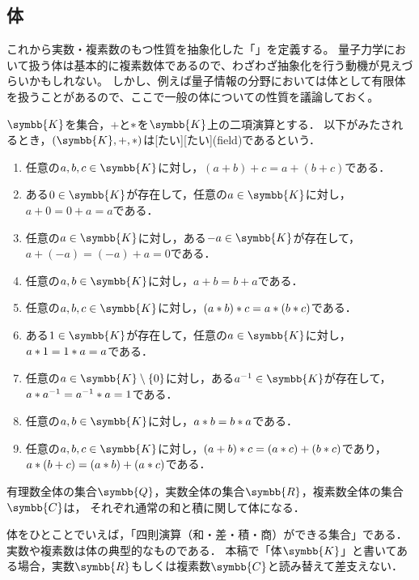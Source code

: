 \documentclass[../sotsu.tex]{subfiles}
\begin{document}
\subsection{体}

これから実数・複素数のもつ性質を抽象化した「」を定義する。
量子力学において扱う体は基本的に複素数体であるので、わざわざ抽象化を行う動機が見えづらいかもしれない。
しかし、例えば量子情報の分野においては体として有限体を扱うことがあるので、ここで一般の体についての性質を議論しておく。

\begin{definition}[体]
    \label{dfn:field}
    $\symbb{K}$を集合，$+$と$\mathbin{\ast}$を$\symbb{K}$上の二項演算とする．
    以下がみたされるとき，$(\symbb{K}, +, \dotprod)$は[たい][たい](field)であるという．
    \begin{enumerate}
        \item \label{field:sum-associative} 任意の$a, b, c \in \symbb{K}$に対し，$(a + b) + c = a + (b + c)$である．
        \item \label{field:sum-zero} ある$0 \in \symbb{K}$が存在して，任意の$a \in \symbb{K}$に対し，$a + 0 = 0 + a = a$である．
        \item \label{field:sum-opposite} 任意の$a \in \symbb{K}$に対し，ある$-a \in \symbb{K}$が存在して，$a + (-a) = (-a) + a = 0$である．
        \item \label{field:sum-commutative} 任意の$a, b \in \symbb{K}$に対し，$a + b = b + a$である．
        \item \label{field:prod-associative} 任意の$a, b, c \in \symbb{K}$に対し，$(a \mathbin{\ast} b) \mathbin{\ast} c = a \mathbin{\ast} (b \mathbin{\ast} c)$である．
        \item \label{field:prod-one} ある$1 \in \symbb{K}$が存在して，任意の$a \in \symbb{K}$に対し，$a \mathbin{\ast} 1 = 1 \mathbin{\ast} a = a$である．
        \item \label{field:prod-reciprocal} 任意の$a \in \symbb{K} \setminus \{0\}$に対し，ある$a^{-1} \in \symbb{K}$が存在して，$a \mathbin{\ast} a^{-1} = a^{-1} \mathbin{\ast} a = 1$である．
        \item \label{field:prod-commutative} 任意の$a, b \in \symbb{K}$に対し，$a \mathbin{\ast} b = b \mathbin{\ast} a$である．
        \item \label{field:distributive} 任意の$a, b, c \in \symbb{K}$に対し，$(a + b) \mathbin{\ast} c = (a \mathbin{\ast} c) + (b \mathbin{\ast} c)$であり，$a \mathbin{\ast} (b + c) = (a \mathbin{\ast} b) + (a \mathbin{\ast} c)$である．
    \end{enumerate}
\end{definition}

\begin{example}
    有理数全体の集合$\symbb{Q}$，実数全体の集合$\symbb{R}$，複素数全体の集合$\symbb{C}$は，
    それぞれ通常の和と積に関して体になる．
\end{example}

体をひとことでいえば，「四則演算（和・差・積・商）ができる集合」である．
実数や複素数は体の典型的なものである．
本稿で「体$\symbb{K}$」と書いてある場合，実数$\symbb{R}$もしくは複素数$\symbb{C}$と読み替えて差支えない．
\end{document}
